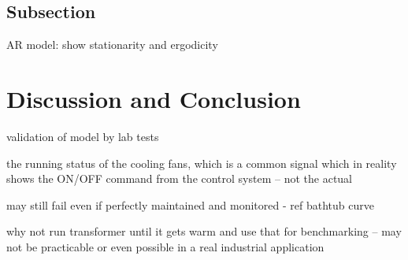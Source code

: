 \documentclass[]{article}
\begin{document}
\subsection{Subsection} \label{sec:subsection-name}

AR model: show stationarity and ergodicity

\section{Discussion and Conclusion} \label{sec:conclusion}


validation of model by lab tests

the running status of the cooling fans, which is a common signal which in reality shows the ON/OFF command from the control system -- not the actual 

may still fail even if perfectly maintained and monitored - ref bathtub curve

why not run transformer until it gets warm and use that for benchmarking -- may not be practicable or even possible in a real industrial application

\clearpage
\vspace{5mm}



\end{document}
